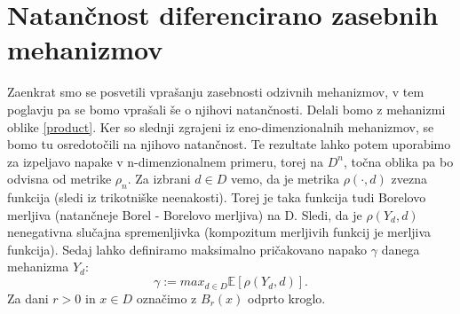 \documentclass[12pt,a4paper]{amsart}
\theoremstyle{definition} %
\theoremstyle{plain} %
\begin{document}
\section{Natančnost diferencirano zasebnih mehanizmov}
Zaenkrat smo se posvetili vprašanju zasebnosti odzivnih mehanizmov, v tem poglavju pa se bomo vprašali še o njihovi natančnosti. Delali bomo z mehanizmi oblike \eqref{product}. Ker so slednji zgrajeni iz eno-dimenzionalnih mehanizmov, se bomo tu osredotočili na njihovo natančnost. Te rezultate lahko potem uporabimo za izpeljavo napake v n-dimenzionalnem primeru, torej na $D^n$, točna oblika pa bo odvisna od metrike $\rho_n$.
\newline
\newline
Za izbrani $d \in D$ vemo, da je metrika $\rho( \cdot , d)$ zvezna funkcija (sledi iz trikotniške neenakosti). Torej je taka funkcija tudi Borelovo merljiva (natančneje Borel - Borelovo merljiva) na D.  Sledi, da je $\rho(Y_d,d)$ nenegativna slučajna spremenljivka (kompozitum merljivih funkcij je merljiva funkcija). Sedaj lahko definiramo maksimalno pričakovano napako $\gamma$ danega mehanizma $Y_d$: $$\gamma := max_{d\in D}\mathbb{E}[\rho(Y_d,d)].$$ Za dani $r > 0$ in $x \in D$ označimo z $B_r(x)$ odprto kroglo. 
\end{document}
